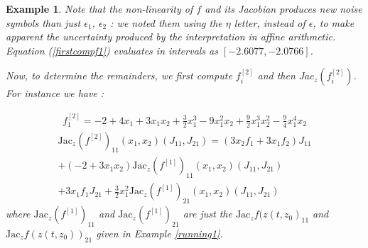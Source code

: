 \documentclass{sig-alternate-05-2015} %
\newtheorem{example}{Example}
\def\intvl#1{\mbox{$[ #1 ]$}}
\begin{document}
\begin{example}
Note that the non-linearity of $f$ and its Jacobian produces new noise symbols than just $\epsilon_1$,
$\epsilon_2$ : we noted them using the $\eta$ letter, instead of $\epsilon$, to make apparent the uncertainty
produced by the interpretation in affine arithmetic. 
Equation (\ref{firstcompf1}) evaluates in intervals
as $\left[-2.6077,-2.0766\right]$.

Now, to determine the remainders, we first compute
$f_i^{[2]}$ and then 
$Jac_z(f_i^{[2]})$. For instance we have : 

\begin{multline}
{f}_1^{[2]} = -2+4x_1+3x_1x_2+\frac{3}{2}x_1^3-9x_1^2x_2
+\frac{9}{2}x_1^3x_2^2-\frac{9}{4}x_1^4x_2
\end{multline}
\begin{multline}
\mbox{Jac}_z(f^{[2]})_{11}(x_1,x_2)(J_{11},J_{21}) = (3x_2f_1+3x_1f_2)J_{11}\\
+(-2+3x_1x_2)\mbox{Jac}_z(f^{[1]})_{11}(x_1,x_2)(J_{11},J_{21}) \\ 
+3x_1f_1J_{21}+\frac{3}{2}x_1^2{\mbox{Jac}_z(f^{[1]})}_{21}(x_1,x_2)(J_{11},J_{21}) 
\label{secondderivative}
\end{multline} %
\noindent where $\mbox{Jac}_z(f^{[1]})_{11}$ %
and ${\mbox{Jac}_z(f^{[1]})}_{21}$ %
are just the $\mbox{Jac}_z f(z(t,z_0)_{11}$ and $\mbox{Jac}_z f(z(t,z_0))_{21}$ given in Example \ref{running1}.


\end{example}
\end{document}

